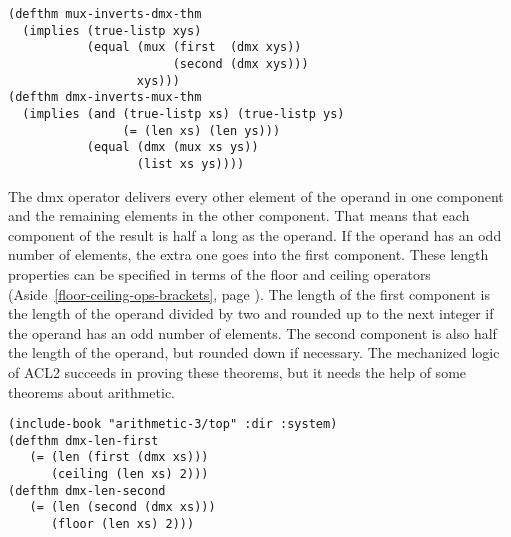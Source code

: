 \label{thm:mux-inverts-dmx}
\label{thm:dmx-inverts-mux}
\begin{Verbatim}
(defthm mux-inverts-dmx-thm
  (implies (true-listp xys)
           (equal (mux (first  (dmx xys))
                       (second (dmx xys)))
                  xys)))
(defthm dmx-inverts-mux-thm
  (implies (and (true-listp xs) (true-listp ys)
                (= (len xs) (len ys)))
           (equal (dmx (mux xs ys))
                  (list xs ys))))
\end{Verbatim}

The dmx operator delivers every other element of the operand in
one component and the remaining elements in the other component.
That means that each component of the result is half a long as the operand.
If the operand has an odd number of elements, the extra one goes into the first component.
These length properties can be specified in terms of the floor and ceiling
operators (Aside~\ref{floor-ceiling-ops-brackets}, page \pageref{floor-ceiling-ops-brackets}).
The length of the first component is the length of the operand divided by two
and rounded up to the next integer if the operand has an odd number of elements.
The second component is also half the length of the operand, but rounded down if necessary.
The mechanized logic of ACL2 succeeds in proving these theorems,
but it needs the help of some theorems about arithmetic.

\label{thm:dmx-length-first-second}
\begin{Verbatim}
(include-book "arithmetic-3/top" :dir :system)
(defthm dmx-len-first
   (= (len (first (dmx xs)))
      (ceiling (len xs) 2)))
(defthm dmx-len-second
   (= (len (second (dmx xs)))
      (floor (len xs) 2)))
\end{Verbatim}

